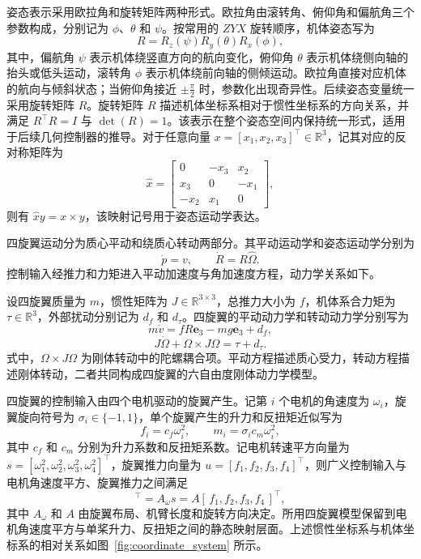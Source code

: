 姿态表示采用欧拉角和旋转矩阵两种形式。欧拉角由滚转角、俯仰角和偏航角三个参数构成，分别记为 $\phi$、$\theta$ 和 $\psi$。按常用的 $ZYX$ 旋转顺序，机体姿态写为
\begin{equation}
    R=R_z(\psi)R_y(\theta)R_x(\phi),
\end{equation}
其中，偏航角 $\psi$ 表示机体绕竖直方向的航向变化，俯仰角 $\theta$ 表示机体绕侧向轴的抬头或低头运动，滚转角 $\phi$ 表示机体绕前向轴的侧倾运动。欧拉角直接对应机体的航向与倾斜状态；当俯仰角接近 $\pm \frac{\pi}{2}$ 时，参数化出现奇异性。后续姿态变量统一采用旋转矩阵 $R$。旋转矩阵 $R$ 描述机体坐标系相对于惯性坐标系的方向关系，并满足 $R^\top R=I$ 与 $\det(R)=1$。该表示在整个姿态空间内保持统一形式，适用于后续几何控制器的推导。对于任意向量 $x=[x_1,x_2,x_3]^\top\in\mathbb R^3$，记其对应的反对称矩阵为
\begin{equation}
    \hat{x}=
    \begin{bmatrix}
        0 & -x_3 & x_2\\
        x_3 & 0 & -x_1\\
        -x_2 & x_1 & 0
    \end{bmatrix},
\end{equation}
则有 $\hat{x}y=x\times y$，该映射记号用于姿态运动学表达。

四旋翼运动分为质心平动和绕质心转动两部分。其平动运动学和姿态运动学分别为
\begin{equation}
    \dot p=v,\qquad \dot R=R\hat{\Omega}.
\end{equation}
控制输入经推力和力矩进入平动加速度与角加速度方程，动力学关系如下。

设四旋翼质量为 $m$，惯性矩阵为 $J\in\mathbb R^{3\times 3}$，总推力大小为 $f$，机体系合力矩为 $\tau\in\mathbb R^3$，外部扰动分别记为 $d_f$ 和 $d_\tau$。四旋翼的平动动力学和转动动力学分别写为
\begin{equation}
    m\dot v=fR\mathbf e_3-mg\mathbf e_3+d_f,
\end{equation}
\begin{equation}
    J\dot\Omega+\Omega\times J\Omega=\tau+d_\tau.
\end{equation}
式中，$\Omega\times J\Omega$ 为刚体转动中的陀螺耦合项。平动方程描述质心受力，转动方程描述刚体转动，二者共同构成四旋翼的六自由度刚体动力学模型。

四旋翼的控制输入由四个电机驱动的旋翼产生。记第 $i$ 个电机的角速度为 $\omega_i$，旋翼旋向符号为 $\sigma_i\in\{-1,1\}$，单个旋翼产生的升力和反扭矩近似写为
\begin{equation}
    f_i=c_f\omega_i^2,\qquad m_i=\sigma_i c_m\omega_i^2,
\end{equation}
其中 $c_f$ 和 $c_m$ 分别为升力系数和反扭矩系数。记电机转速平方向量为 $s=[\omega_1^2,\omega_2^2,\omega_3^2,\omega_4^2]^\top$，旋翼推力向量为 $u=[f_1,f_2,f_3,f_4]^\top$，则广义控制输入与电机角速度平方、旋翼推力之间满足
\begin{equation}
    [\,f,\tau_x,\tau_y,\tau_z\,]^\top=A_\omega s=A[\,f_1,f_2,f_3,f_4\,]^\top,
\end{equation}
其中 $A_\omega$ 和 $A$ 由旋翼布局、机臂长度和旋转方向决定。所用四旋翼模型保留到电机角速度平方与单桨升力、反扭矩之间的静态映射层面。上述惯性坐标系与机体坐标系的相对关系如图~\ref{fig:coordinate_system} 所示。

